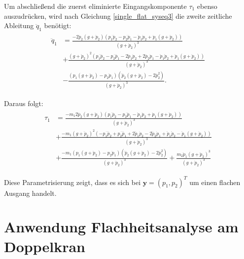 Um abschließend die zuerst eliminierte Eingangskomponente $\tau_1$ ebenso auszudrücken, wird nach Gleichung \ref{single_flat_syseq3} die zweite zeitliche Ableitung $\ddot{q}_1$ benötigt:
\begin{align}
	\begin{split}
	\ddot{q}_1 &=
	\frac{-2 \dddot{p}_{2} \left(g + \ddot{p}_{2}\right) \left(p_{1} \dddot{p}_{2} - p_{2} \dddot{p}_{1} - \ddot{p}_{1} \dot{p}_{2} + \dot{p}_{1} \left(g + \ddot{p}_{2}\right)\right) }{\left(g + \ddot{p}_{2}\right)^{3}} \\	
	&+ \frac{\left(g + \ddot{p}_{2}\right)^{2} \left(p_{1} \ddddot{p}_{2} - p_{2} \ddddot{p}_{1} - 2 \dddot{p}_{1} \dot{p}_{2} + 2 \dddot{p}_{2} \dot{p}_{1} - \ddot{p}_{1} \ddot{p}_{2} + \ddot{p}_{1} \left(g + \ddot{p}_{2}\right)\right)}{\left(g + \ddot{p}_{2}\right)^{3}}\\	
	&- \frac{\left(p_{1} \left(g + \ddot{p}_{2}\right) - p_{2} \ddot{p}_{1}\right) \left(\ddddot{p}_{2} \left(g + \ddot{p}_{2}\right) - 2 \dddot{p}_{2}^{2}\right)}{\left(g + \ddot{p}_{2}\right)^{3}}.
	\end{split}
\end{align}

Daraus folgt:
\begin{align}
	\begin{split}
	\tau_1 &=
	\frac{- m_{1} 2 \dddot{p}_{2} \left(g + \ddot{p}_{2}\right) \left(p_{1} \dddot{p}_{2} - p_{2} \dddot{p}_{1} - \ddot{p}_{1} \dot{p}_{2} + \dot{p}_{1} \left(g + \ddot{p}_{2}\right)\right)}{\left(g + \ddot{p}_{2}\right)^{3}} \\	
	&+ \frac{- m_{1} \left(g + \ddot{p}_{2}\right)^{2} \left(- p_{1} \ddddot{p}_{2} + p_{2} \ddddot{p}_{1} + 2 \dddot{p}_{1} \dot{p}_{2} - 2 \dddot{p}_{2} \dot{p}_{1} + \ddot{p}_{1} \ddot{p}_{2} - \ddot{p}_{1} \left(g + \ddot{p}_{2}\right)\right)}{\left(g + \ddot{p}_{2}\right)^{3}} \\
	&+ \frac{-m_1 \left(p_{1} \left(g + \ddot{p}_{2}\right) - p_{2} \ddot{p}_{1}\right) \left(\ddddot{p}_{2} \left(g + \ddot{p}_{2}\right) - 2 \dddot{p}_{2}^{2}\right)}{\left(g + \ddot{p}_{2}\right)^{3}} + \frac{m_{2} \ddot{p}_{1} \left(g + \ddot{p}_{2}\right)^{3}}{\left(g + \ddot{p}_{2}\right)^{3}}
	\end{split}
\end{align}

Diese Parametrisierung zeigt, dass es sich bei $\mathbf{y} = (p_1, p_2)^T$ um einen flachen Ausgang handelt.

\section{Anwendung Flachheitsanalyse am Doppelkran}

